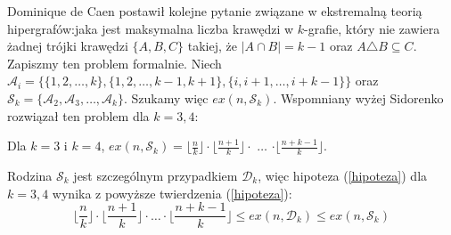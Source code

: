 \documentclass[miz,woman]{mgrwms}
\begin{document}
Dominique de Caen postawił kolejne pytanie związane w ekstremalną teorią hipergrafów:jaka jest maksymalna liczba krawędzi w
$k$-grafie, który nie zawiera żadnej trójki krawędzi $\{A,B,C\}$ takiej, że $|A \cap B|=k-1$ oraz $A \triangle B \subseteq C$. 
Zapiszmy ten problem formalnie. Niech $\mathcal{A}_i=\{\{1,2,\dots,k\},\{1,2,\dots,k-1,k+1\},\{i,i+1,\dots,i+k-1\}\}$
oraz\\
$\mathcal{S}_k=\{\mathcal{A}_2,\mathcal{A}_3,\dots,\mathcal{A}_k\}$. Szukamy więc $ex(n,\mathcal{S}_k)$. Wspomniany wyżej 
Sidorenko rozwiązał ten problem dla $k=3,4$:
\begin{tw}\label{Sidorenko}
 Dla $k=3$ i $k=4$, $ex(n,\mathcal{S}_k)=\lfloor \frac{n}{k} \rfloor \cdot \lfloor \frac{n+1}{k} \rfloor 
\cdot$ $\dots$ $\cdot \lfloor \frac{n+k-1}{k} \rfloor$.
\end{tw}
Rodzina $\mathcal{S}_k$ jest szczególnym przypadkiem $\mathcal{D}_k$, więc hipoteza (\ref{hipoteza}) dla $k=3,4$ wynika z
powyższe twierdzenia (\ref{hipoteza}):
\begin{equation}
 \lfloor \frac{n}{k} \rfloor \cdot \lfloor \frac{n+1}{k} \rfloor 
\cdot \dots \cdot \lfloor \frac{n+k-1}{k} \rfloor \leq ex(n, \mathcal{D}_k) \leq ex(n, \mathcal{S}_k)
\end{equation}
\end{document}
